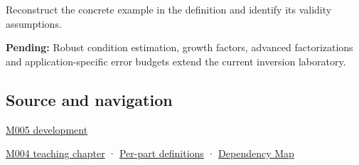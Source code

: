 Reconstruct the concrete example in the definition and identify its validity assumptions.

\textbf{Pending:} Robust condition estimation, growth factors, advanced factorizations and application-specific error budgets extend the current inversion laboratory.

\subsection{Source and navigation}\label{appendix-8f6a01f284a7-source-and-navigation}

\hyperref[01-foundations-i-ch001-when-arithmetic-meets-uncertainty]{M005 development}

\hyperref[01-foundations-i-ch001-a-stretching-ruler-for-real-valued-quantities]{M004 teaching chapter} · \hyperref[appendix-fd090d982a15-m004---parts-61-76]{Per-part definitions} · \hyperref[appendix-4ad47bdd269a]{Dependency Map}
